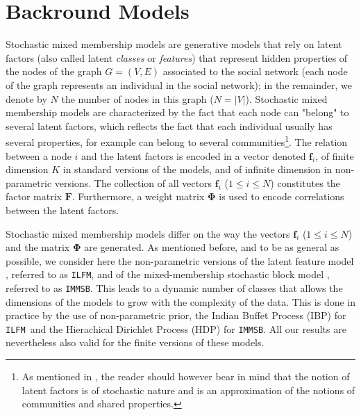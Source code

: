\documentclass[journal]{IEEEtran}
\newcommand{\ifm}{\texttt{ILFM}}
\newcommand{\imb}{\texttt{IMMSB}}
\newcommand{\mat}[1]{\mathbf{#1}}
\begin{document}
\section{Backround Models}
\label{sec:background}

Stochastic mixed membership models are generative models that rely on latent factors (also called latent \textit{classes} or \textit{features}) that represent hidden properties of the nodes of the graph $G=(V,E)$ associated to the social network (each node of the graph represents an individual in the social network); in the remainder, we denote by $N$ the number of nodes in this graph ($N=|V|$). Stochastic mixed membership models are characterized by the fact that each node can "belong" to several latent factors, which reflects the fact that each individual usually has several properties, for example can belong to several communities\footnote{As mentioned in \cite{goldenberg2010survey}, the reader should however bear in mind that the notion of latent factors is of stochastic nature and is an approximation of the notions of communities and shared properties.}. The relation between a node $i$ and the latent factors is encoded in a vector denoted $\mat{f}_{i}$, of finite dimension $K$ in standard versions of the models, and of infinite dimension in  non-parametric versions. The collection of all vectors $\mat{f}_{i}$ ($1 \le i \le N$) constitutes the factor matrix $\mat{F}$. Furthermore, a weight matrix $\mat{\Phi}$ is used to encode correlations between the latent factors.

Stochastic mixed membership models differ on the way the vectors $\mat{f}_{i}$ ($1 \le i \le N$) and the matrix $\mat{\Phi}$ are generated. As mentioned before, and to be as general as possible, we consider here the non-parametric versions of the latent feature model \cite{ILFRM}, referred to as \ifm, and of the mixed-membership stochastic block model \cite{iMMSB,fan2015dynamic}, referred to as \imb. This leads to a dynamic number of classes that allows the dimensions of the models to grow with the complexity of the data. This is done in practice by the use of non-parametric prior,  the Indian Buffet Process (IBP) for \ifm\ and the Hierachical Dirichlet Process (HDP)  for \imb. All our results are nevertheless also valid for the finite versions of these models.~\\
\end{document}
